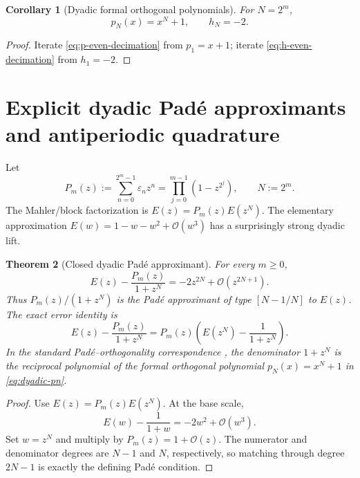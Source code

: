 \documentclass[11pt]{article}
\newtheorem{theorem}{Theorem}[section]
\newtheorem{corollary}[theorem]{Corollary}
\theoremstyle{definition}
\theoremstyle{remark}
\newcommand{\eps}{\varepsilon}
\newcommand{\bigO}{\mathcal O}
\begin{document}
\begin{corollary}[Dyadic formal orthogonal polynomials]
\label{cor:dyadic-pn}
For \(N=2^m\),
\begin{equation}
\boxed{
 p_N(x)=x^N+1,
 \qquad h_N=-2.}                                           \label{eq:dyadic-pn}
\end{equation}
\end{corollary}

\begin{proof}
Iterate \eqref{eq:p-even-decimation} from \(p_1=x+1\); iterate
\eqref{eq:h-even-decimation} from \(h_1=-2\).
\end{proof}

\section{Explicit dyadic Pad\'e approximants and antiperiodic quadrature}
\label{sec:dyadic-pade}

Let
\begin{equation}
 P_m(z):=\sum_{n=0}^{2^m-1}\eps_nz^n
        =\prod_{j=0}^{m-1}(1-z^{2^j}),
 \qquad N:=2^m.                                            \label{eq:Pm-def}
\end{equation}
The Mahler/block factorization is \(E(z)=P_m(z)E(z^N)\).  The elementary approximation
\(E(w)=1-w-w^2+\bigO(w^3)\) has a surprisingly strong dyadic lift.

\begin{theorem}[Closed dyadic Pad\'e approximant]
\label{thm:dyadic-pade}
For every \(m\ge0\),
\begin{equation}
\boxed{
 E(z)-\frac{P_m(z)}{1+z^N}
 =-2z^{2N}+\bigO(z^{2N+1}).}                               \label{eq:dyadic-pade}
\end{equation}
Thus \(P_m(z)/(1+z^N)\) is the Pad\'e approximant of type \([N-1/N]\) to \(E(z)\).
The exact error identity is
\begin{equation}
 E(z)-\frac{P_m(z)}{1+z^N}
 =P_m(z)\left(E(z^N)-\frac1{1+z^N}\right).                \label{eq:dyadic-pade-error}
\end{equation}
In the standard Pad\'e--orthogonality correspondence \cite{BakerGravesMorris,Chihara}, the denominator \(1+z^N\) is the reciprocal polynomial of the formal orthogonal
polynomial \(p_N(x)=x^N+1\) in \eqref{eq:dyadic-pn}.
\end{theorem}

\begin{proof}
Use \(E(z)=P_m(z)E(z^N)\).  At the base scale,
\[
 E(w)-\frac1{1+w}=-2w^2+\bigO(w^3).
\]
Set \(w=z^N\) and multiply by \(P_m(z)=1+\bigO(z)\).  The numerator and denominator
degrees are \(N-1\) and \(N\), respectively, so matching through degree \(2N-1\) is
exactly the defining Pad\'e condition.
\end{proof}
\end{document}
